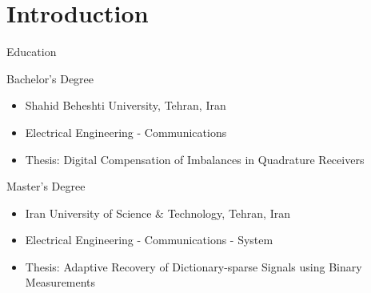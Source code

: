 \section{Introduction}
\begin{frame}{Education}{}
	\begin{block}{Bachelor's Degree}
		\begin{itemize}
			\item Shahid Beheshti University, Tehran, Iran
			\item Electrical Engineering - Communications
			\item Thesis: Digital Compensation of Imbalances in Quadrature Receivers
		\end{itemize}
	\end{block}
	\begin{block}{Master's Degree}
		\begin{itemize}
			\item Iran University of Science \& Technology, Tehran, Iran
			\item Electrical Engineering - Communications - System
			\item Thesis: Adaptive Recovery of Dictionary-sparse Signals using Binary Measurements
		\end{itemize}
	\end{block}
\end{frame}
